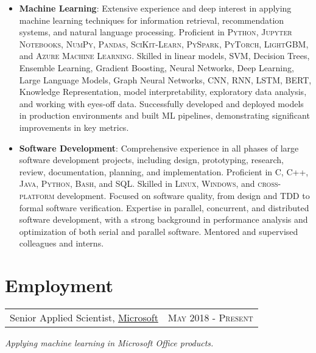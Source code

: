 \documentclass{article}
\makeatletter
\newcommand{\whatwherewhen}[3]{
\noindent\begin{tabular*}{\columnwidth}{@{}@{\extracolsep{\fill}}lr@{}}
#1, #2 & \textsc{#3}
\end{tabular*}}
\makeatother
\begin{document}
\begin{itemize}

\item \textbf{Machine Learning}: Extensive experience and deep interest in applying machine learning techniques for information retrieval, recommendation systems, and natural language processing. Proficient in \textsc{Python}, \textsc{Jupyter Notebooks}, \textsc{NumPy}, \textsc{Pandas}, \textsc{SciKit-Learn}, \textsc{PySpark}, \textsc{PyTorch}, \textsc{LightGBM}, and \textsc{Azure Machine Learning}. Skilled in linear models, SVM, Decision Trees, Ensemble Learning, Gradient Boosting, Neural Networks, Deep Learning, Large Language Models, Graph Neural Networks, CNN, RNN, LSTM, BERT, Knowledge Representation, model interpretability, exploratory data analysis, and working with eyes-off data. Successfully developed and deployed models in production environments and built ML pipelines, demonstrating significant improvements in key metrics.

\item \textbf{Software Development}: Comprehensive experience in all phases of large software development projects, including design, prototyping, research, review, documentation, planning, and implementation. Proficient in \textsc{C}, \textsc{C++}, \textsc{Java}, \textsc{Python}, \textsc{Bash}, and \textsc{SQL}. Skilled in \textsc{Linux}, \textsc{Windows}, and \textsc{cross-platform} development. Focused on software quality, from design and TDD to formal software verification. Expertise in parallel, concurrent, and distributed software development, with a strong background in performance analysis and optimization of both serial and parallel software. Mentored and supervised colleagues and interns.

\end{itemize}


\section{Employment}

\whatwherewhen{Senior Applied Scientist}{\href{https://www.microsoft.com/}{Microsoft}}{May 2018 - Present}

\textit{Applying machine learning in Microsoft Office products.}
\end{document}
